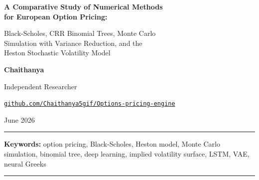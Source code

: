 \documentclass[12pt,a4paper]{article}
\begin{document}
\begin{titlepage}
  \centering
  \vspace*{1.5cm}
  {\LARGE\bfseries A Comparative Study of Numerical Methods\\[6pt]
  for European Option Pricing:\par}
  \vspace{0.5cm}
  {\large Black-Scholes, CRR Binomial Trees, Monte Carlo\\
  Simulation with Variance Reduction, and the\\
  Heston Stochastic Volatility Model\par}
  \vspace{1.5cm}
  {\large\bfseries Chaithanya\par}
  \vspace{0.4cm}
  {\normalsize Independent Researcher\par}
  \vspace{0.4cm}
  {\normalsize \href{https://github.com/Chaithanya5gif/Options-pricing-engine}%
    {\texttt{github.com/Chaithanya5gif/Options-pricing-engine}}\par}
  \vspace{1.5cm}
  {\normalsize June 2026\par}
  \vspace{1cm}
  \hrule
  \vspace{0.4cm}
  \textbf{Keywords:} option pricing, Black-Scholes, Heston model, Monte Carlo simulation,
  binomial tree, deep learning, implied volatility surface, LSTM, VAE, neural Greeks
  \vspace{0.4cm}
  \hrule
\end{titlepage}

\begin{abstract}
\noindent
This paper presents a systematic, reproducible comparison of classical numerical
methods, stochastic volatility models, and modern deep learning approaches for
pricing European options.
Seven methodologies are implemented from scratch in Python and evaluated
head-to-head on 200~live SPY call options (June 2026).
We benchmark the Black-Scholes analytical formula, the Cox--Ross--Rubinstein
binomial lattice, Monte Carlo simulation with antithetic and control-variate
variance reduction, and the Heston (1993) stochastic volatility model—alongside
three deep learning architectures: a Multi-Layer Perceptron (MLP), an
LSTM-based volatility forecaster, and a Variational Autoencoder (VAE) for
implied-volatility surface generation.
Classical GBM methods cluster at MAE \$0.904 with near-identical accuracy;
the Heston model achieves MAE \$1.04 while being the only method that
structurally reproduces the empirical negative-skew implied-volatility smile
($\rho=-0.7$, IV range 17.3\%–23.0\%).
Deep learning architectures do not outperform Black-Scholes on point accuracy
for vanilla calls but solve structurally distinct problems.
All source code is publicly available.
\end{abstract}
\end{document}
